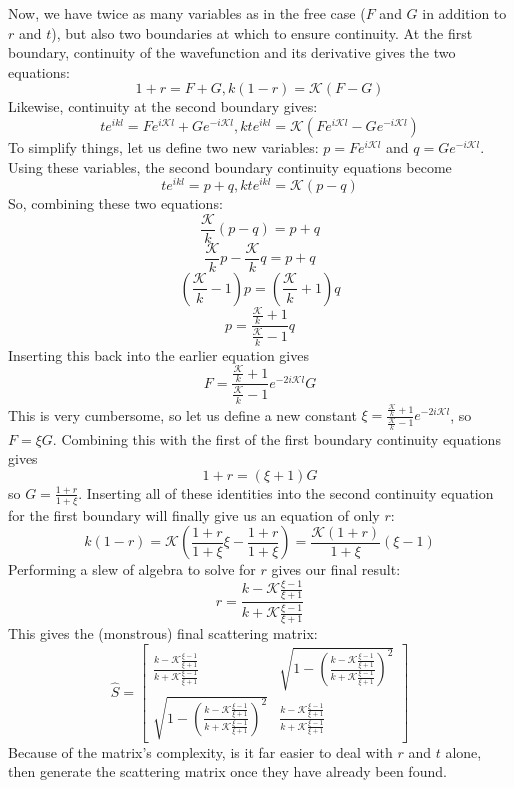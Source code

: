 \documentclass{report}
\begin{document}
Now, we have twice as many variables as in the free case ($F$ and $G$ in addition to $r$ and $t$), but also two boundaries at which to ensure continuity. At the first boundary, continuity of the wavefunction and its derivative gives the two equations:
\[
1 + r = F + G, k(1 - r) = \mathcal{K}(F - G)
\]
Likewise, continuity at the second boundary gives:
\[
te^{ikl} = Fe^{i\mathcal{K}l} + Ge^{-i\mathcal{K}l}, kte^{ikl} = \mathcal{K}(Fe^{i\mathcal{K}l} - Ge^{-i\mathcal{K}l})
\]
To simplify things, let us define two new variables: $p = Fe^{i\mathcal{K}l}$ and $q = Ge^{-i\mathcal{K}l}$. Using these variables, the second boundary continuity equations become
\[
te^{ikl} = p + q, kte^{ikl} = \mathcal{K}(p - q)
\]
So, combining these two equations:
\[
\frac{\mathcal{K}}{k}(p - q) = p + q
\]
\[
\frac{\mathcal{K}}{k}p - \frac{\mathcal{K}}{k}q = p + q
\]
\[
(\frac{\mathcal{K}}{k} - 1)p = (\frac{\mathcal{K}}{k} + 1)q
\]
\[
p = \frac{\frac{\mathcal{K}}{k} + 1}{\frac{\mathcal{K}}{k} - 1}q
\]
Inserting this back into the earlier equation gives
\[
F = \frac{\frac{\mathcal{K}}{k} + 1}{\frac{\mathcal{K}}{k} - 1}e^{-2i\mathcal{K}l}G
\]
This is very cumbersome, so let us define a new constant $\xi = \frac{\frac{\mathcal{K}}{k} + 1}{\frac{\mathcal{K}}{k} - 1}e^{-2i\mathcal{K}l}$, so $F = \xi G$. Combining this with the first of the first boundary continuity equations gives
\[
1 + r = (\xi + 1)G
\]
so $G = \frac{1+r}{1+\xi}$. Inserting all of these identities into the second continuity equation for the first boundary will finally give us an equation of only $r$:
\[
k(1 - r) = \mathcal{K}(\frac{1+r}{1+\xi}\xi - \frac{1+r}{1+\xi}) = \frac{\mathcal{K}(1+r)}{1+\xi}(\xi - 1)
\]
Performing a slew of algebra to solve for $r$ gives our final result:
\[
r = \frac{k - \mathcal{K}\frac{\xi - 1}{\xi + 1}}{k + \mathcal{K}\frac{\xi - 1}{\xi + 1}}
\]
This gives the (monstrous) final scattering matrix:
\[
\hat{S} = \begin{bmatrix} \frac{k - \mathcal{K}\frac{\xi - 1}{\xi + 1}}{k + \mathcal{K}\frac{\xi - 1}{\xi + 1}} & \sqrt{1 - (\frac{k - \mathcal{K}\frac{\xi - 1}{\xi + 1}}{k + \mathcal{K}\frac{\xi - 1}{\xi + 1}})^2} \\ \sqrt{1 - (\frac{k - \mathcal{K}\frac{\xi - 1}{\xi + 1}}{k + \mathcal{K}\frac{\xi - 1}{\xi + 1}})^2} & \frac{k - \mathcal{K}\frac{\xi - 1}{\xi + 1}}{k + \mathcal{K}\frac{\xi - 1}{\xi + 1}} \end{bmatrix}
\]
Because of the matrix's complexity, is it far easier to deal with $r$ and $t$ alone, then generate the scattering matrix once they have already been found.
\end{document}
